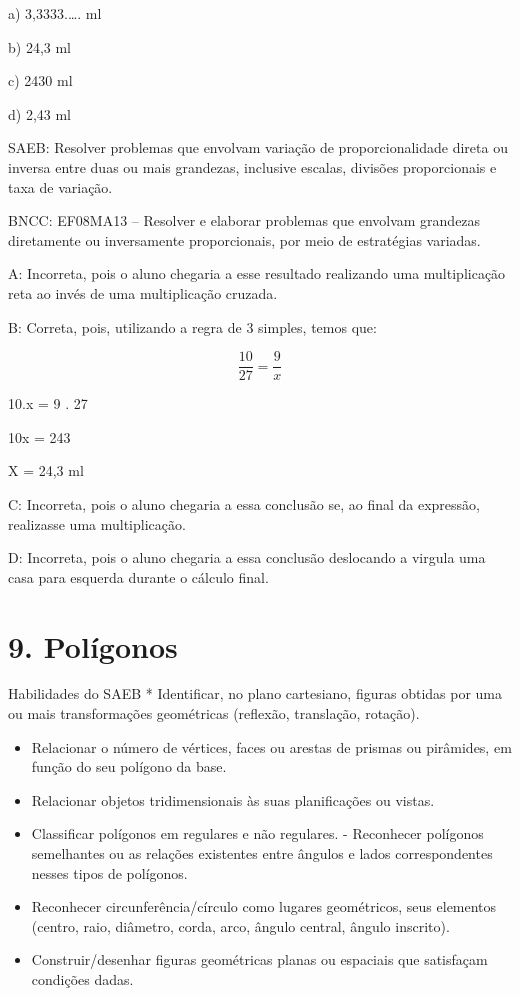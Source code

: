 a) 3,3333.\ldots. ml

b) 24,3 ml

c) 2430 ml

d) 2,43 ml

SAEB: Resolver problemas que envolvam variação de proporcionalidade
direta ou inversa entre duas ou mais grandezas, inclusive escalas,
divisões proporcionais e taxa de variação.

BNCC: EF08MA13 -- Resolver e elaborar problemas que envolvam grandezas
diretamente ou inversamente proporcionais, por meio de estratégias
variadas.

A: Incorreta, pois o aluno chegaria a esse resultado realizando uma
multiplicação reta ao invés de uma multiplicação cruzada.

B: Correta, pois, utilizando a regra de 3 simples, temos que:

\[\frac {10}{27} = \frac{9}{x}\]

10.x = 9 . 27

10x = 243

X = 24,3 ml

C: Incorreta, pois o aluno chegaria a essa conclusão se, ao final da
expressão, realizasse uma multiplicação.

D: Incorreta, pois o aluno chegaria a essa conclusão deslocando a
virgula uma casa para esquerda durante o cálculo final.

\hypertarget{poluxedgonos}{%
\section{9. Polígonos}\label{poluxedgonos}}

Habilidades do SAEB * Identificar, no plano cartesiano, figuras obtidas
por uma ou mais transformações geométricas (reflexão, translação,
rotação).

\begin{itemize}
\item
  Relacionar o número de vértices, faces ou arestas de prismas ou
  pirâmides, em função do seu polígono da base.
\item
  Relacionar objetos tridimensionais às suas planificações ou vistas.
\item
  Classificar polígonos em regulares e não regulares. - Reconhecer
  polígonos semelhantes ou as relações existentes entre ângulos e lados
  correspondentes nesses tipos de polígonos.
\item
  Reconhecer circunferência/círculo como lugares geométricos, seus
  elementos (centro, raio, diâmetro, corda, arco, ângulo central, ângulo
  inscrito).
\item
  Construir/desenhar figuras geométricas planas ou espaciais que
  satisfaçam condições dadas.
\end{itemize}

